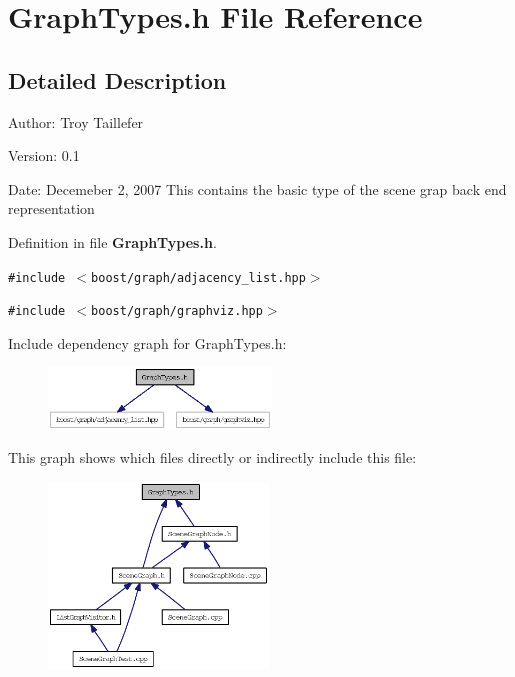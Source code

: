 \section{GraphTypes.h File Reference}
\label{GraphTypes_8h}


\subsection{Detailed Description}
\begin{Desc}
\item[Author:]Troy Taillefer \end{Desc}


\begin{Desc}
\item[Version:]0.1 \end{Desc}
\begin{Desc}
\item[Date:]Decemeber 2, 2007 This contains the basic type of the scene grap back end representation \end{Desc}


Definition in file {\bf GraphTypes.h}.

{\tt \#include $<$boost/graph/adjacency\_\-list.hpp$>$}\par
{\tt \#include $<$boost/graph/graphviz.hpp$>$}\par


Include dependency graph for GraphTypes.h:\nopagebreak
\begin{figure}[H]
\begin{center}
\leavevmode
\includegraphics[width=168pt]{GraphTypes_8h__incl}
\end{center}
\end{figure}


This graph shows which files directly or indirectly include this file:\nopagebreak
\begin{figure}[H]
\begin{center}
\leavevmode
\includegraphics[width=166pt]{GraphTypes_8h__dep__incl}
\end{center}
\end{figure}
